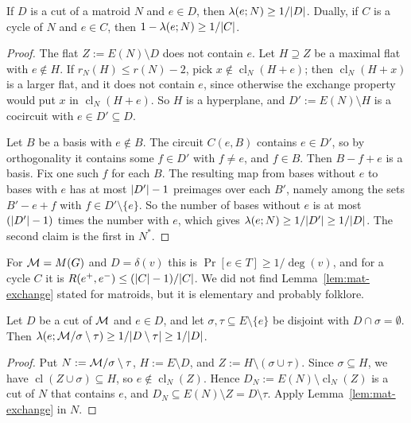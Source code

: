 \begin{lemma}\label{lem:mat-exchange}
If $D$ is a cut of a matroid $N$ and $e\in D$, then $\lambda(e;N)\ge1/\lvert D\rvert$. Dually, if $C$ is a cycle of $N$ and $e\in C$, then $1-\lambda(e;N)\ge1/\lvert C\rvert$.
\end{lemma}

\begin{proof}
The flat $Z:=E(N)\setminus D$ does not contain $e$. Let $H\supseteq Z$ be a maximal flat with $e\notin H$. If $r_N(H)\le r(N)-2$, pick $x\notin\operatorname{cl}_N(H+e)$; then $\operatorname{cl}_N(H+x)$ is a larger flat, and it does not contain $e$, since otherwise the exchange property would put $x$ in $\operatorname{cl}_N(H+e)$. So $H$ is a hyperplane, and $D':=E(N)\setminus H$ is a cocircuit with $e\in D'\subseteq D$.

Let $B$ be a basis with $e\notin B$. The circuit $C(e,B)$ contains $e\in D'$, so by orthogonality it contains some $f\in D'$ with $f\ne e$, and $f\in B$. Then $B-f+e$ is a basis. Fix one such $f$ for each $B$. The resulting map from bases without $e$ to bases with $e$ has at most $\lvert D'\rvert-1$ preimages over each $B'$, namely among the sets $B'-e+f$ with $f\in D'\setminus\{e\}$. So the number of bases without $e$ is at most $(\lvert D'\rvert-1)$ times the number with $e$, which gives $\lambda(e;N)\ge1/\lvert D'\rvert\ge1/\lvert D\rvert$. The second claim is the first in $N^*$.
\end{proof}

For $\mathcal{M}=M(G)$ and $D=\delta(v)$ this is $\Pr[e\in T]\ge1/\deg(v)$, and for a cycle $C$ it is $R(e^+,e^-)\le(\lvert C\rvert-1)/\lvert C\rvert$. We did not find Lemma~\ref{lem:mat-exchange} stated for matroids, but it is elementary and probably folklore.

\begin{lemma}\label{lem:mat-survive}
Let $D$ be a cut of $\mathcal{M}$ and $e\in D$, and let $\sigma,\tau\subseteq E\setminus\{e\}$ be disjoint with $D\cap\sigma=\emptyset$. Then $\lambda(e;\mathcal{M}/\sigma\setminus\tau)\ge1/\lvert D\setminus\tau\rvert\ge1/\lvert D\rvert$.
\end{lemma}

\begin{proof}
Put $N:=\mathcal{M}/\sigma\setminus\tau$, $H:=E\setminus D$, and $Z:=H\setminus(\sigma\cup\tau)$. Since $\sigma\subseteq H$, we have $\operatorname{cl}(Z\cup\sigma)\subseteq H$, so $e\notin\operatorname{cl}_N(Z)$. Hence $D_N:=E(N)\setminus\operatorname{cl}_N(Z)$ is a cut of $N$ that contains $e$, and $D_N\subseteq E(N)\setminus Z=D\setminus\tau$. Apply Lemma~\ref{lem:mat-exchange} in $N$.
\end{proof}

